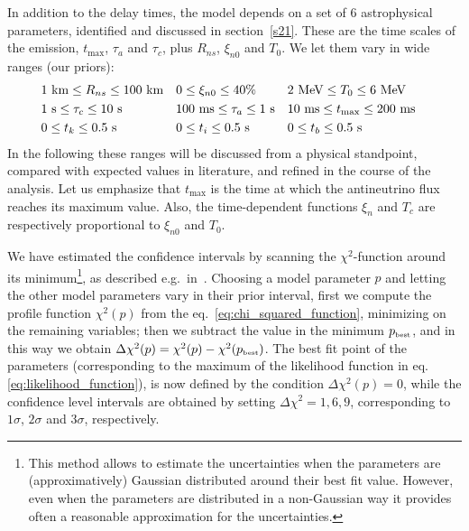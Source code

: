 \documentclass[a4paper,11pt]{article}
\begin{document}
In addition to the delay times, the model  depends on a set of 6 astrophysical parameters, identified and discussed in   section~\ref{s21}. These are  the time scales of the emission,
$t_{\text{max}}$, $\tau_a$ and  $\tau_c$, plus  $R_{ns}$, $\xi_{n0}$ and $T_0$.
We let them  vary in   wide ranges (our priors):
\begin{align}
     &\mbox{1~km}\leq R_{ns }\leq \mbox{100~km}&
    &0\leq \xi_{n0} \leq 40\% &
      &\mbox{2~MeV}\leq T_0 \leq \mbox{6~MeV}& \notag \\      &\mbox{1~s}\leq \tau_c \leq \mbox{10~s}&  
     &\mbox{100~ms}\leq \tau_a \leq \mbox{1~s}&  &\mbox{10~ms}\leq t_{\text{max}} \leq \mbox{200~ms}&    \\
        &\mbox{0}\leq  t_k\leq \mbox{0.5~s}&
        &\mbox{0}\leq  t_i\leq \mbox{0.5~s}& 
        &\mbox{0}\leq  t_b\leq \mbox{0.5~s}& \notag
\end{align}
In the following  these ranges will  be discussed  from a physical standpoint, compared  with  expected values in literature, and refined  in the course of the analysis.
Let us emphasize that 
$t_{\text{max}}$ is the time at which the antineutrino flux reaches its maximum value. Also,
the time-dependent functions  $\xi_n$ and $T_c$ 
are respectively proportional to $\xi_{n0}$ and $T_0$. 





We have estimated the confidence intervals by  scanning  the $\chi^2$-function around its minimum\footnote{This method allows to estimate the uncertainties when the parameters are (approximatively) Gaussian distributed around their best fit value. However, even when  the parameters are  distributed in a non-Gaussian way it provides often a reasonable approximation for the uncertainties.}, as described e.g.\ in~\cite{Lista:2016tva}. 
 Choosing a model parameter $p$ and letting the other model parameters vary in their prior interval, first we compute the profile function $\chi^2(p)$ from the  
eq.~\eqref{eq:chi_squared_function}, minimizing on the remaining variables; then we subtract the value in the minimum $p_{\mbox{\tiny best}}$, and in this way we obtain $\Delta \chi^2(p)=\chi^2(p) - \chi^2(p_{\mbox{\tiny best}})$.
 The best fit point of the parameters (corresponding to the maximum of the  likelihood function in eq.\,\eqref{eq:likelihood_function}), is now defined by the condition $\Delta \chi^2(p)=0$,  
while the  confidence level intervals are obtained by setting  $\Delta \chi^2=1, 6, 9$, corresponding to $1\sigma$, $2\sigma$ and $3\sigma$, respectively.
\end{document}
